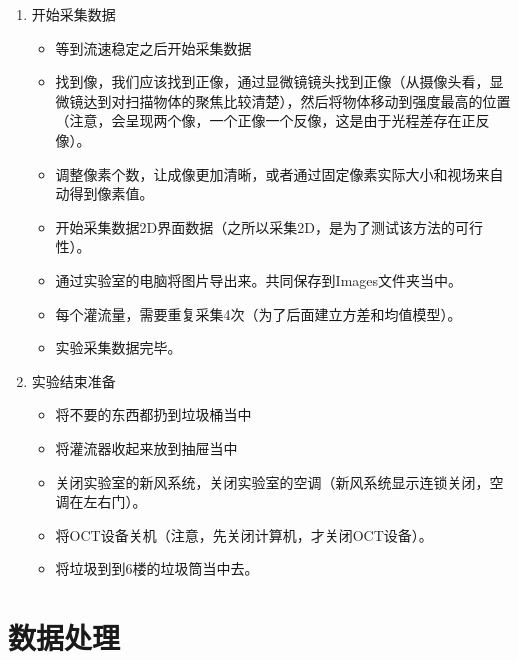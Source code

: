 \documentclass[12pt]{article}
\begin{document}
\begin{enumerate}
    \item 开始采集数据
    \begin{itemize}
        \item 等到流速稳定之后开始采集数据
        \item 找到像，我们应该找到正像，通过显微镜镜头找到正像（从摄像头看，显微镜达到对扫描物体的聚焦比较清楚），然后将物体移动到强度最高的位置（注意，会呈现两个像，一个正像一个反像，这是由于光程差存在正反像）。
        \item 调整像素个数，让成像更加清晰，或者通过固定像素实际大小和视场来自动得到像素值。
        \item 开始采集数据2D界面数据（之所以采集2D，是为了测试该方法的可行性）。
        \item 通过实验室的电脑将图片导出来。共同保存到Images文件夹当中。
        \item 每个灌流量，需要重复采集4次（为了后面建立方差和均值模型）。
        \item 实验采集数据完毕。
    \end{itemize}

    \item 实验结束准备
    \begin{itemize}
        \item 将不要的东西都扔到垃圾桶当中
        \item 将灌流器收起来放到抽屉当中
        \item 关闭实验室的新风系统，关闭实验室的空调（新风系统显示连锁关闭，空调在左右门）。
        \item 将OCT设备关机（注意，先关闭计算机，才关闭OCT设备）。
        \item 将垃圾到到6楼的垃圾筒当中去。
    \end{itemize}
\end{enumerate}

\section{数据处理}
\end{document}
